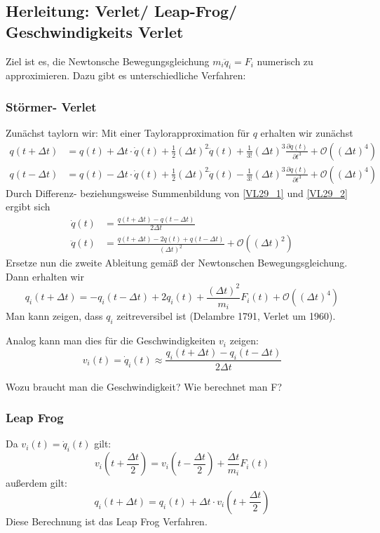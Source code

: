 \documentclass[]{article}
\begin{document}
\subsection*{Herleitung: Verlet/ Leap-Frog/ Geschwindigkeits Verlet}
Ziel ist  es, die Newtonsche Bewegungsgleichung  $m_i \ddot{q}_i = F_i$ numerisch zu approximieren. Dazu gibt es unterschiedliche Verfahren: 

\subsubsection*{Störmer- Verlet}
Zunächst taylorn wir: 
Mit einer Taylorapproximation für $q$ erhalten wir zunächst
\begin{align}
q(t + \Delta t) &= q(t) + \Delta t \cdot \dot{q}(t)
+ \frac{1}{2} (\Delta t)^2 \ddot{q}(t)
+ \frac{1}{3!} (\Delta t)^3 \frac{\partial q(t)}{\partial t^3}
+ \mathcal{O}((\Delta t)^4) \label{VL29_1}\\ 
q(t - \Delta t) &= q(t) - \Delta t \cdot \dot{q}(t)
+ \frac{1}{2} (\Delta t)^2 \ddot{q}(t)
- \frac{1}{3!} (\Delta t)^3 \frac{\partial q(t)}{\partial t^3}
+ \mathcal{O}((\Delta t)^4) \label{VL29_2}
\end{align}
Durch Differenz- beziehungsweise Summenbildung von \eqref{VL29_1} und \eqref{VL29_2} ergibt sich
\begin{align*}
\dot{q}(t) &= 
\frac{q(t + \Delta t) - q(t- \Delta t)}{2 \Delta t} \\
\ddot{q}(t) &=
\frac{q(t + \Delta t) - 2 q(t) + q(t - \Delta t)}{(\Delta t)^2} + \mathcal{O}((\Delta t)^2)
\end{align*}
Ersetze nun die zweite Ableitung gemäß der Newtonschen Bewegungsgleichung. Dann erhalten wir
\begin{equation*}
q_i (t + \Delta t) = - q_i(t - \Delta t) + 2 q_i (t) + \frac{(\Delta t)^2}{m_i} F_i(t) + \mathcal{O}((\Delta t)^4)
\end{equation*}
Man kann zeigen, dass $q_i$ zeitreversibel ist (Delambre 1791, Verlet um 1960). 

Analog kann man dies für die Geschwindigkeiten $v_i$ zeigen:
\begin{equation*}
v_{i} (t) = \dot{q}_i (t) \approx \frac{q_i(t+ \Delta t) - q_i (t - \Delta t)}{2 \Delta t}
\end{equation*}

Wozu braucht man die Geschwindigkeit? Wie berechnet man F? 

\subsubsection*{Leap Frog}
Da $v_i(t)=\dot{q}_i(t)$ gilt: 
\begin{equation*}
v_i \left(t + \frac{\Delta t}{2} \right) = v_i \left(t - \frac{\Delta t}{2} \right) + \frac{\Delta t}{m_i} F_i (t)
\end{equation*}
außerdem gilt: 
\begin{equation}
q_i(t + \Delta t) = q_i(t) + \Delta t \cdot v_i \left(t+ \frac{\Delta t}{2} \right)
\end{equation}
Diese Berechnung ist das Leap Frog Verfahren. 
\end{document}
